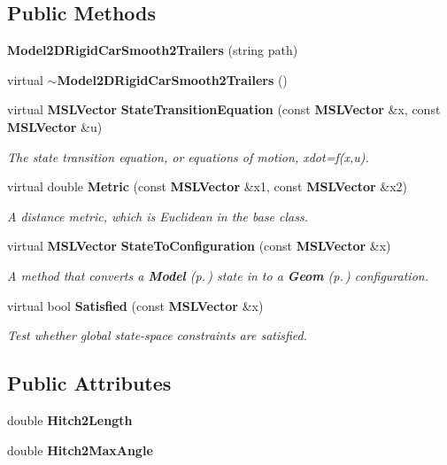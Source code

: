 \subsection*{Public Methods}
\begin{CompactItemize}
\item 
{\bf Model2DRigid\-Car\-Smooth2Trailers} (string path)
\item 
virtual {\bf $\sim$Model2DRigid\-Car\-Smooth2Trailers} ()
\item 
virtual {\bf MSLVector} {\bf State\-Transition\-Equation} (const {\bf MSLVector} \&x, const {\bf MSLVector} \&u)
\begin{CompactList}\small\item\em The state transition equation, or equations of motion, xdot=f(x,u).\item\end{CompactList}\item 
virtual double {\bf Metric} (const {\bf MSLVector} \&x1, const {\bf MSLVector} \&x2)
\begin{CompactList}\small\item\em A distance metric, which is Euclidean in the base class.\item\end{CompactList}\item 
virtual {\bf MSLVector} {\bf State\-To\-Configuration} (const {\bf MSLVector} \&x)
\begin{CompactList}\small\item\em A method that converts a {\bf Model} {\rm (p.\,\pageref{class_Model})} state in to a {\bf Geom} {\rm (p.\,\pageref{class_Geom})} configuration.\item\end{CompactList}\item 
virtual bool {\bf Satisfied} (const {\bf MSLVector} \&x)
\begin{CompactList}\small\item\em Test whether global state-space constraints are satisfied.\item\end{CompactList}\end{CompactItemize}
\subsection*{Public Attributes}
\begin{CompactItemize}
\item 
double {\bf Hitch2Length}
\item 
double {\bf Hitch2Max\-Angle}
\end{CompactItemize}


